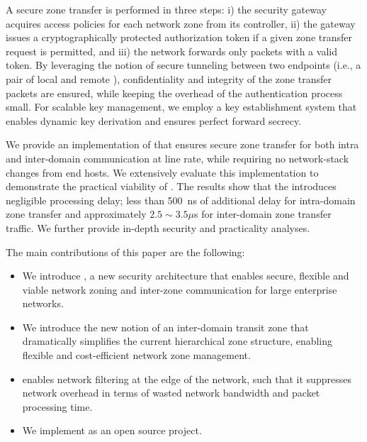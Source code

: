 A secure zone transfer is performed in three steps: i) the security gateway
acquires access policies for each network zone from its controller, ii) the
gateway issues a cryptographically protected authorization token if a given zone
transfer request is permitted, and iii) the network forwards only packets with a
valid token. By leveraging the notion of secure tunneling between two endpoints
(i.e., a pair of local and remote \tps), confidentiality and integrity of the
zone transfer packets are ensured, while keeping the overhead of the
authentication process small. For scalable key management, we employ a key
establishment system that enables dynamic key derivation and ensures perfect
forward secrecy.

We provide an implementation of \name that ensures secure zone transfer for
both intra and inter-domain communication at line rate, while requiring no network-stack
changes from end hosts. We extensively evaluate this implementation to demonstrate
the practical viability of \name. The results show that the \tp introduces negligible
processing delay; less than \SI{500}{ns} of additional delay for intra-domain zone transfer
and approximately $2.5 \sim 3.5 \mu$s for inter-domain zone transfer traffic. We further
provide in-depth security and practicality analyses.

The main contributions of this paper are the following:
\begin{itemize}
	\item We introduce \name, a new security architecture that enables secure, flexible
	      and viable network zoning and inter-zone communication for large enterprise
	      networks.
	\item We introduce the new notion of an inter-domain transit zone that dramatically
	      simplifies the current hierarchical zone structure, enabling flexible and cost-efficient
	      network zone management.
	\item \name enables network filtering at the edge of the network, such that it suppresses
	      network overhead in terms of wasted network bandwidth and packet processing time.
	\item We implement \name as an open source project.
\end{itemize}

